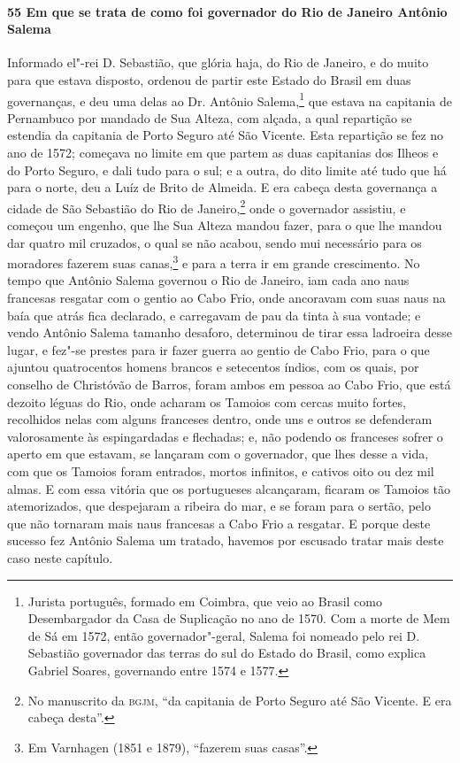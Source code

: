 \paragraph{55 Em que se trata de como foi governador do Rio de Janeiro Antônio Salema}

Informado el"-rei D. Sebastião, que glória haja, do Rio de Janeiro, e do muito para que
estava disposto, ordenou de partir este Estado do Brasil em duas governanças, e deu uma
delas ao Dr. Antônio Salema,\footnote{ Jurista português, formado em Coimbra, que veio ao
Brasil como Desembargador da Casa de Suplicação no ano de 1570. Com a morte de Mem de Sá
em 1572, então governador"-geral, Salema foi nomeado pelo rei D. Sebastião governador das
terras do sul do Estado do Brasil, como explica Gabriel Soares, governando entre 1574 e
1577.} que estava na capitania de Pernambuco por mandado de Sua Alteza, com alçada, a
qual repartição se estendia da capitania de Porto Seguro até São Vicente. Esta repartição
se fez no ano de 1572; começava no limite em que partem as duas capitanias dos Ilheos e do
Porto Seguro, e dali tudo para o sul; e a outra, do dito limite até tudo que há para o
norte, deu a Luíz de Brito de Almeida. E era cabeça desta governança a cidade de São
Sebastião do Rio de Janeiro,\footnote{ No manuscrito da \textsc{bgjm}, ``da capitania de
Porto Seguro até São Vicente. E era cabeça desta''.} onde o governador assistiu, e começou
um engenho, que lhe Sua Alteza mandou fazer, para o que lhe mandou dar quatro mil
cruzados, o qual se não acabou, sendo mui necessário para os moradores fazerem suas
canas,\footnote{ Em Varnhagen (1851 e 1879), ``fazerem suas casas''.} e para a terra ir em
grande crescimento. No tempo que Antônio Salema governou o Rio de Janeiro, iam cada ano
naus francesas resgatar com o gentio ao Cabo Frio, onde ancoravam com suas naus na baía
que atrás fica declarado, e carregavam de pau da tinta à sua vontade; e vendo Antônio
Salema tamanho desaforo, determinou de tirar essa ladroeira desse lugar, e fez"-se prestes
para ir fazer guerra ao gentio de Cabo Frio, para o que ajuntou quatrocentos homens
brancos e setecentos índios, com os quais, por conselho de Christóvão de Barros, foram
ambos em pessoa ao Cabo Frio, que está dezoito léguas do Rio, onde acharam os Tamoios com
cercas muito fortes, recolhidos nelas com alguns franceses dentro, onde uns e outros se
defenderam valorosamente às espingardadas e flechadas; e, não podendo os franceses sofrer
o aperto em que estavam, se lançaram com o governador, que lhes desse a vida, com que os
Tamoios foram entrados, mortos infinitos, e cativos oito ou dez mil almas. E com essa
vitória que os portugueses alcançaram, ficaram os Tamoios tão atemorizados, que despejaram
a ribeira do mar, e se foram para o sertão, pelo que não tornaram mais naus francesas a
Cabo Frio a resgatar. E porque deste sucesso fez Antônio Salema um tratado, havemos por
escusado tratar mais deste caso neste capítulo.


